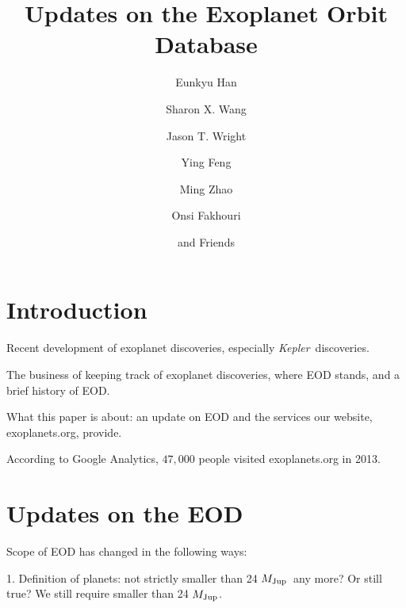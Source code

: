\documentclass[11pt,preprint]{aastex}
\def\kepler{\textit{Kepler}}
\def\mjup{$M_{\rm Jup}$}
\begin{document}
\begin{CJK*}{UTF8}{gbsn}

\title{Updates on the Exoplanet Orbit Database}

\author{Eunkyu Han}
\author{Sharon X. Wang}
\author{Jason T. Wright}
\author{Ying Feng}
\author{Ming Zhao}
\author{Onsi Fakhouri}
\author{and Friends}



\begin{abstract}

\end{abstract}  

\section{Introduction}\label{sec:intro}

Recent development of exoplanet discoveries, especially
\kepler\ discoveries.

The business of keeping track of exoplanet discoveries, where EOD
stands, and a brief history of EOD.

What this paper is about: an update on EOD and the services our
website, exoplanets.org, provide.

According to Google Analytics, $47,000$ people visited exoplanets.org
in 2013.


\section{Updates on the EOD}\label{sec:update}

Scope of EOD has changed in the following ways:

1. Definition of planets: not strictly smaller than 24 \mjup\ any
more? Or still true? We still require smaller than 24 \mjup.


\end{CJK*}
\end{document}
